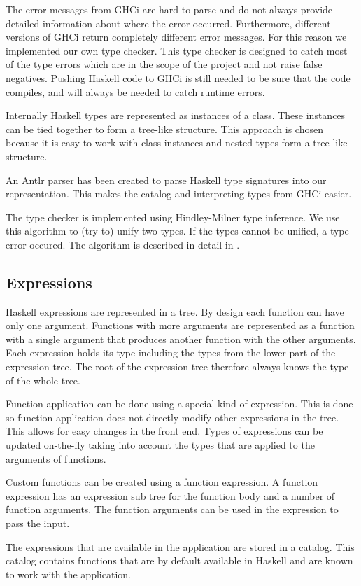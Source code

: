 The error messages from GHCi are hard to parse and do not always provide detailed information about where the error
occurred. Furthermore, different versions of GHCi return completely different error messages.
For this reason we implemented our own type checker. This type checker is designed to catch most of the type errors 
which are in the scope of the project and not raise false negatives. Pushing Haskell code to GHCi is still needed
to be sure that the code compiles, and will always be needed to catch runtime errors.

Internally Haskell types are represented as instances of a class. These instances can be tied together to form a
tree-like structure. This approach is chosen because it is easy to work with class instances and nested types form
a tree-like structure. 

An Antlr parser has been created to parse Haskell type signatures into our representation. This makes the catalog and interpreting types from GHCi easier.

The type checker is implemented using Hindley-Milner type inference. We use this algorithm to (try to) unify two
types. If the types cannot be unified, a type error occured. The algorithm is described in detail in
\cite{borisov}.  

\subsection{Expressions}

Haskell expressions are represented in a tree.
By design each function can have only one argument.
Functions with more arguments are represented as a function with a single argument that produces another function with the other arguments.
Each expression holds its type including the types from the lower part of the expression tree. The root of the
expression tree therefore always knows the type of the whole tree.

Function application can be done using a special kind of expression.
This is done so function application does not directly modify other expressions in the tree.
This allows for easy changes in the front end.
Types of expressions can be updated on-the-fly taking into account the types that are applied to the arguments of functions.

Custom functions can be created using a function expression.
A function expression has an expression sub tree for the function body and a number of function arguments.
The function arguments can be used in the expression to pass the input.

The expressions that are available in the application are stored in a catalog. This catalog contains functions that are
by default available in Haskell and are known to work with the application.
